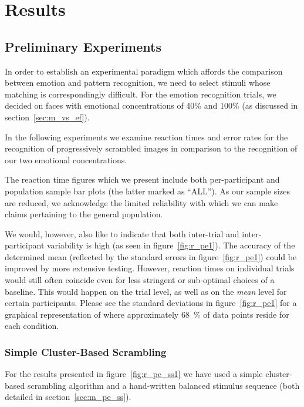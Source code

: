 



\chapter{Results}                                                                          
    \section{Preliminary Experiments}\label{sec:r_pe}
	In order to establish an experimental paradigm which affords the comparison between emotion and pattern recognition, we need to select stimuli whose matching is correspondingly difficult.
	For the emotion recognition trials, we decided on faces with emotional concentrations of 40\% and 100\% (as discussed in section~\ref{sec:m_vs_ef}).
	
	In the following experiments we examine reaction times and error rates for the recognition of progressively scrambled images in comparison to the recognition of our two emotional concentrations.

	
	The reaction time figures which we present include both per-participant and population sample bar plots (the latter marked as “ALL”).
	As our sample sizes are reduced, we acknowledge the limited reliability with which we can make claims pertaining to the general population. 
	
	We would, however, also like to indicate that both inter-trial and inter-participant variability is high (as seen in figure~\ref{fig:r_pe1}).
	The accuracy of the determined mean (reflected by the standard errors in figure~\ref{fig:r_pe1}) could be improved by more extensive testing.
	However, reaction times on individual trials would still often coincide even for less stringent or sub-optimal choices of a baseline.  
	This would happen on the trial level, as well as on the \textit{mean} level for certain participants.
	Please see the standard deviations in figure~\ref{fig:r_pe1} for a graphical representation of where approximately \SI{68}{\percent} of data points reside for each condition.
	\subsection{Simple Cluster-Based Scrambling}\label{sec:r_pe_ss}
	    For the results presented in figure~\ref{fig:r_pe_ss1} we have used a simple cluster-based scrambling algorithm and a hand-written balanced stimulus sequence 
	    (both detailed in section~\ref{sec:m_pe_ss}).
	    
